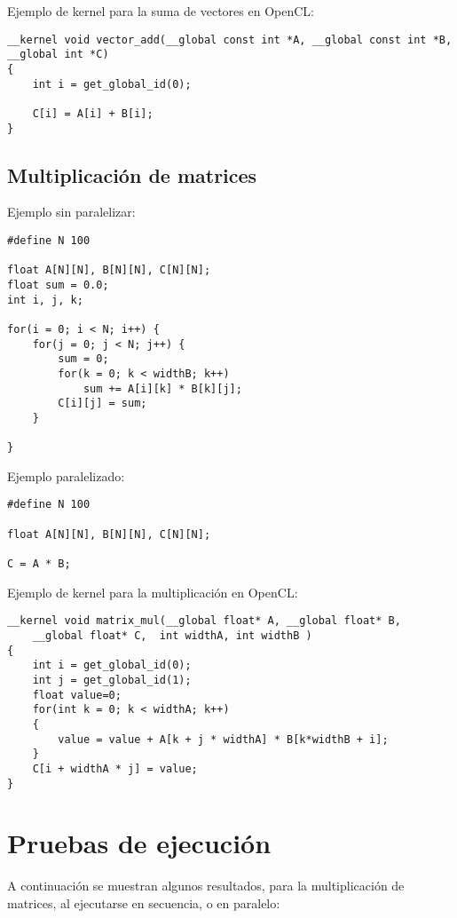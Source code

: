 \documentclass[12pt,a4paper]{article}
\begin{document}
Ejemplo de kernel para la suma de vectores en OpenCL:
\begin{lstlisting}
__kernel void vector_add(__global const int *A, __global const int *B, __global int *C)
{ 
    int i = get_global_id(0);
 
    C[i] = A[i] + B[i];
}
\end{lstlisting}
\subsection{Multiplicación de matrices}
Ejemplo sin paralelizar:
\begin{lstlisting}
#define N 100

float A[N][N], B[N][N], C[N][N];
float sum = 0.0;
int i, j, k;

for(i = 0; i < N; i++) {
	for(j = 0; j < N; j++) {
		sum = 0;
		for(k = 0; k < widthB; k++)
			sum += A[i][k] * B[k][j];
		C[i][j] = sum;
	}

}
\end{lstlisting}

Ejemplo paralelizado:
\begin{lstlisting}
#define N 100

float A[N][N], B[N][N], C[N][N];

C = A * B;
\end{lstlisting}

Ejemplo de kernel para la multiplicación en OpenCL:
\begin{lstlisting}
__kernel void matrix_mul(__global float* A, __global float* B, 
	__global float* C,  int widthA, int widthB )
{
    int i = get_global_id(0);
    int j = get_global_id(1);
    float value=0;
    for(int k = 0; k < widthA; k++)
    {
        value = value + A[k + j * widthA] * B[k*widthB + i];
    }
    C[i + widthA * j] = value;
}
\end{lstlisting}
\section{Pruebas de ejecución}
A continuación se muestran algunos resultados, para la multiplicación de matrices, al ejecutarse en secuencia, o en
paralelo:
\end{document}
